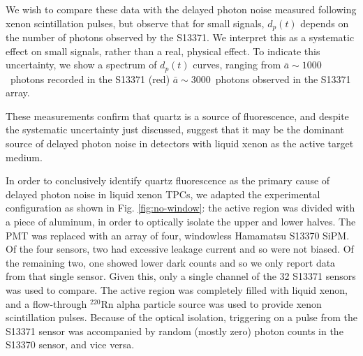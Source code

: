 \documentclass[%
 reprint,
superscriptaddress,
nofootinbib,
 amsmath,amssymb,
 aps,
prl,
]{revtex4-2}
\begin{document}
We wish to compare these data with the delayed photon noise measured following xenon scintillation pulses, but observe that for small signals, $d_p(t)$ depends on the number of photons observed by the S13371. We interpret this as a systematic effect on small signals, rather than a real, physical effect. To indicate this uncertainty, we show a spectrum of $d_p(t)$ curves, ranging from $\bar{a}\sim1000$~photons recorded in the S13371 (red)  $\bar{a}\sim3000$~photons observed in the S13371 array. 




These measurements confirm that quartz is a source of fluorescence, and despite the systematic uncertainty just discussed, suggest that it may be the dominant source of delayed photon noise in detectors with liquid xenon as the active target medium. 

In order to conclusively identify quartz fluorescence as the primary cause of delayed photon noise in liquid xenon TPCs, we adapted the experimental configuration as shown in Fig. \ref{fig:no-window}: the active region was divided with a piece of aluminum, in order to optically isolate the upper and lower halves. The PMT was replaced with an array of four, windowless Hamamatsu S13370 SiPM. Of the four sensors, two had excessive leakage current and so were not biased. Of the remaining two, one showed lower dark counts and so we only report data from that single sensor. Given this, only a single channel of the 32 S13371 sensors was used to compare. The active region was completely filled with liquid xenon, and a flow-through $^{220}$Rn alpha particle source was used to provide xenon scintillation pulses. Because of the optical isolation, triggering on a pulse from the S13371 sensor was accompanied by random (mostly zero) photon counts in the S13370 sensor, and vice versa. 
\end{document}
